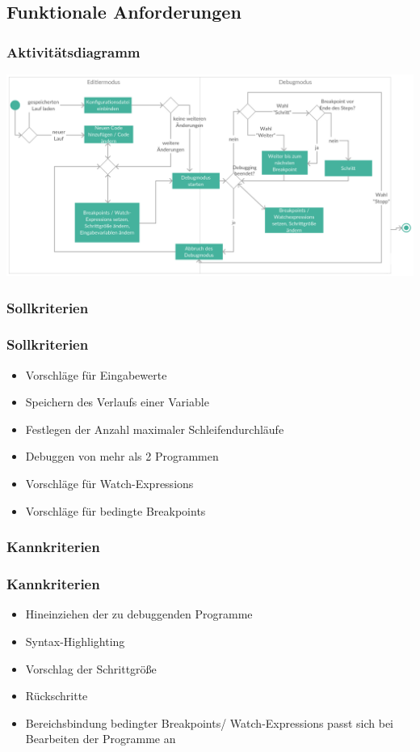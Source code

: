 \documentclass{beamer}
\begin{document}
\subsection{Funktionale Anforderungen}
\begin{frame}
\frametitle{Aktivitätsdiagramm}
\includegraphics[scale=0.125]{../Aktivitaetsdiagramm}
\end{frame}
\subsubsection{Sollkriterien}
\begin{frame}
\frametitle{Sollkriterien}
\begin{itemize}
\item Vorschläge für Eingabewerte
\item Speichern des Verlaufs einer Variable
\item Festlegen der Anzahl maximaler Schleifendurchläufe
\item Debuggen von mehr als 2 Programmen
\item Vorschläge für Watch-Expressions
\item Vorschläge für bedingte Breakpoints
\end{itemize}
\end{frame}

\subsubsection{Kannkriterien}
\begin{frame}
\frametitle{Kannkriterien}
\begin{itemize}
\item Hineinziehen der zu debuggenden Programme
\item Syntax-Highlighting
\item Vorschlag der Schrittgröße
\item Rückschritte
\item Bereichsbindung bedingter Breakpoints/ Watch-Expressions passt sich bei Bearbeiten der Programme an
\end{itemize}
\end{frame}
\end{document}
